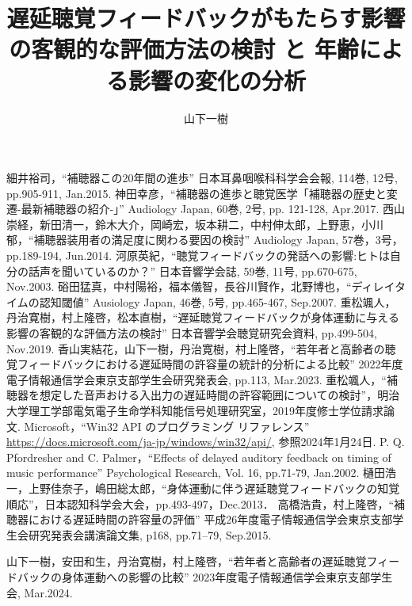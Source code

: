 \documentclass[a4paper,12pt]{jsreport}
\title{遅延聴覚フィードバックがもたらす影響の客観的な評価方法の検討
と
年齢による影響の変化の分析}
\author{山下\hspace{1zw}一樹}%
\begin{document}
\makecover%
\tableofcontents%










\begin{thebibliography}{99}
	細井裕司，``補聴器この20年間の進歩'' 日本耳鼻咽喉科科学会会報, 114巻, 12号, pp.905-911, Jan.2015.
  神田幸彦，``補聴器の進歩と聴覚医学「補聴器の歴史と変遷-最新補聴器の紹介-」'' Audiology Japan, 60巻, 2号, pp. 121-128, Apr.2017.
  西山崇経，新田清一，鈴木大介，岡崎宏，坂本耕二，中村伸太郎，上野恵，小川郁，``補聴器装用者の満足度に関わる要因の検討'' Audiology Japan, 57巻，3号，pp.189-194, Jun.2014.
  河原英紀，``聴覚フィードバックの発話への影響:ヒトは自分の話声を聞いているのか？'' 日本音響学会誌, 59巻, 11号, pp.670-675, Nov.2003.
  硲田猛真，中村陽裕，福本儀智，長谷川賢作，北野博也，``ディレイタイムの認知閾値'' Ausiology Japan, 46巻, 5号, pp.465-467, Sep.2007.
  重松颯人，丹治寛樹，村上隆啓，松本直樹，``遅延聴覚フィードバックが身体運動に与える影響の客観的な評価方法の検討'' 日本音響学会聴覚研究会資料, pp.499-504, Nov.2019.
  香山実結花，山下一樹，丹治寛樹，村上隆啓，``若年者と高齢者の聴覚フィードバックにおける遅延時間の許容量の統計的分析による比較'' 2022年度電子情報通信学会東京支部学生会研究発表会, pp.113, Mar.2023.
  重松颯人，``補聴器を想定した音声おける入出力の遅延時間の許容範囲についての検討''，明治大学理工学部電気電子生命学科知能信号処理研究室，2019年度修士学位請求論文.
  Microsoft，``Win32 API のプログラミング リファレンス'' \url{https://docs.microsoft.com/ja-jp/windows/win32/api/}, 参照2024年1月24日.
  P. Q. Pfordresher and C. Palmer，``Effects of delayed auditory feedback on timing of music performance'' Psychological Research, Vol. 16, pp.71-79, Jan.2002.
  樋田浩一，上野佳奈子，嶋田総太郎，``身体運動に伴う遅延聴覚フィードバックの知覚順応''，日本認知科学会大会，pp.493-497，Dec.2013．
  高橋浩貴，村上隆啓，``補聴器における遅延時間の許容量の評価'' 平成26年度電子情報通信学会東京支部学生会研究発表会講演論文集, p168, pp.71--79, Sep.2015.

\end{thebibliography}
\begin{thepublished}{99}
	山下一樹，安田和生，丹治寛樹，村上隆啓，``若年者と高齢者の遅延聴覚フィードバックの身体運動への影響の比較'' 2023年度電子情報通信学会東京支部学生会, Mar.2024.
	
\end{thepublished}
\newpage



\appendix

% 

% 
% 
\end{document}
